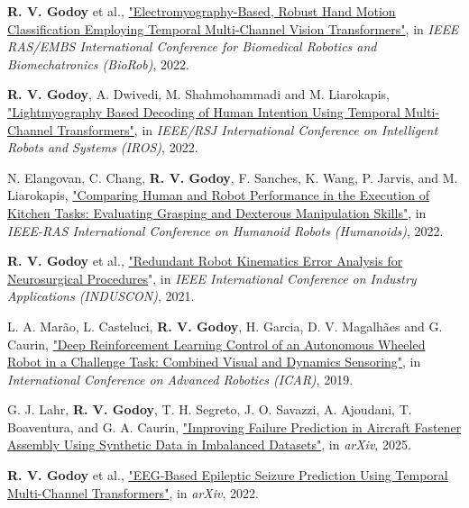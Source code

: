 \begin{cvparagraph}
\textbf{R. V. Godoy} et al., \href{https://ieeexplore.ieee.org/document/9925307}{"Electromyography-Based, Robust Hand Motion Classification Employing Temporal Multi-Channel Vision Transformers"}, in \textit{IEEE RAS/EMBS International Conference for Biomedical Robotics and Biomechatronics (BioRob)}, 2022.

\textbf{R. V. Godoy}, A. Dwivedi, M. Shahmohammadi and M. Liarokapis, \href{https://ieeexplore.ieee.org/document/9981514}{"Lightmyography Based Decoding of Human Intention Using Temporal Multi-Channel Transformers"}, in \textit{IEEE/RSJ International Conference on Intelligent Robots and Systems (IROS)}, 2022.

N. Elangovan, C. Chang, \textbf{R. V. Godoy}, F. Sanches, K. Wang, P. Jarvis, and M. Liarokapis, \href{https://ieeexplore.ieee.org/document/10000248}{"Comparing Human and Robot Performance in the Execution of Kitchen Tasks: Evaluating Grasping and Dexterous Manipulation Skills"}, in \textit{IEEE-RAS International Conference on Humanoid Robots (Humanoids)}, 2022.

\textbf{R. V. Godoy} et al., \href{https://ieeexplore.ieee.org/document/9529675}{"Redundant Robot Kinematics Error Analysis for Neurosurgical Procedures}", in \textit{IEEE International Conference on Industry Applications (INDUSCON)}, 2021.

L. A. Marão, L. Casteluci, \textbf{R. V. Godoy}, H. Garcia, D. V. Magalhães and G. Caurin, \href{https://ieeexplore.ieee.org/document/8981598}{"Deep Reinforcement Learning Control of an Autonomous Wheeled Robot in a Challenge Task: Combined Visual and Dynamics Sensoring"}, in \textit{International Conference on Advanced Robotics (ICAR)}, 2019.

\vspace{5pt} 



G. J. Lahr, \textbf{R. V. Godoy}, T. H. Segreto, J. O. Savazzi, A. Ajoudani, T. Boaventura, and G. A. Caurin, \href{https://arxiv.org/abs/2505.03917}{"Improving Failure Prediction in Aircraft Fastener Assembly Using Synthetic Data in Imbalanced Datasets"}, in \textit{arXiv}, 2025.

\textbf{R. V. Godoy} et al., \href{https://arxiv.org/abs/2209.11172}{"EEG-Based Epileptic Seizure Prediction Using Temporal Multi-Channel Transformers"}, in \textit{arXiv}, 2022.




\end{cvparagraph}
